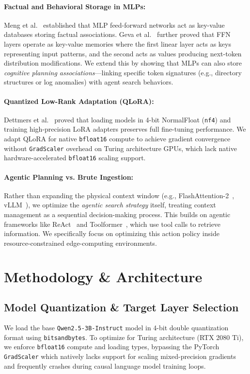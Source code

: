 \documentclass[10pt,twocolumn]{article}
\begin{document}
\paragraph{Factual and Behavioral Storage in MLPs:} Meng et al.~\cite{meng2022rome, meng2023memit} established that MLP feed-forward networks act as key-value databases storing factual associations. Geva et al.~\cite{geva2021transformer, geva2022transformer} further proved that FFN layers operate as key-value memories where the first linear layer acts as keys representing input patterns, and the second acts as values producing next-token distribution modifications. We extend this by showing that MLPs can also store \textit{cognitive planning associations}---linking specific token signatures (e.g., directory structures or log anomalies) with agent search behaviors.

\paragraph{Quantized Low-Rank Adaptation (QLoRA):} Dettmers et al.~\cite{dettmers2024qlora} proved that loading models in 4-bit NormalFloat (\texttt{nf4}) and training high-precision LoRA adapters preserves full fine-tuning performance. We adapt QLoRA for native \texttt{bfloat16} compute to achieve gradient convergence without \texttt{GradScaler} overhead on Turing architecture GPUs, which lack native hardware-accelerated \texttt{bfloat16} scaling support.

\paragraph{Agentic Planning vs. Brute Ingestion:} Rather than expanding the physical context window (e.g., FlashAttention-2~\cite{dao2023flashattention}, vLLM~\cite{kwon2023efficient}), we optimize the \textit{agentic search strategy} itself, treating context management as a sequential decision-making process. This builds on agentic frameworks like ReAct~\cite{yao2022react} and Toolformer~\cite{schick2023toolformer}, which use tool calls to retrieve information. We specifically focus on optimizing this action policy inside resource-constrained edge-computing environments.

\section{Methodology \& Architecture}

\subsection{Model Quantization \& Target Layer Selection}
We load the base \texttt{Qwen2.5-3B-Instruct} model in 4-bit double quantization format using \texttt{bitsandbytes}. To optimize for Turing architecture (RTX 2080 Ti), we enforce \texttt{bfloat16} compute and loading types, bypassing the PyTorch \texttt{GradScaler} which natively lacks support for scaling mixed-precision gradients and frequently crashes during causal language model training loops.
\end{document}
